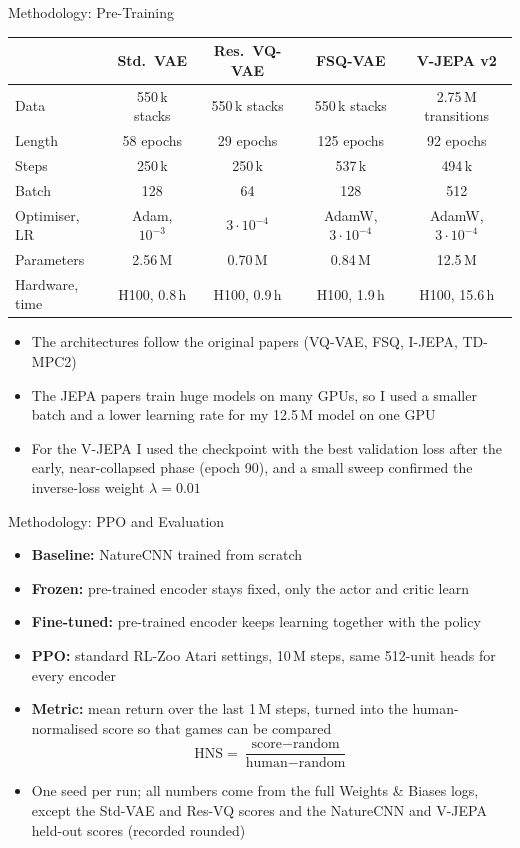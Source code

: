 \documentclass[aspectratio=43,10pt]{beamer}
\begin{document}
\begin{frame}{Methodology: Pre-Training}
  \centering
  {\scriptsize\setlength{\tabcolsep}{3pt}
  \begin{tabular}{@{}lcccc@{}}
    \toprule
    & Std.\ VAE & Res.\ VQ-VAE & FSQ-VAE & V-JEPA v2 \\
    \midrule
    Data & 550\,k stacks & 550\,k stacks & 550\,k stacks & 2.75\,M transitions \\
    Length & 58 epochs & 29 epochs & 125 epochs & 92 epochs \\
    Steps & 250\,k & 250\,k & 537\,k & 494\,k \\
    Batch & 128 & 64 & 128 & 512 \\
    Optimiser, LR & Adam, $10^{-3}$ & $3{\cdot}10^{-4}$ & AdamW, $3{\cdot}10^{-4}$ & AdamW, $3{\cdot}10^{-4}$ \\
    Parameters & 2.56\,M & 0.70\,M & 0.84\,M & 12.5\,M \\
    Hardware, time & H100, 0.8\,h & H100, 0.9\,h & H100, 1.9\,h & H100, 15.6\,h \\
    \bottomrule
  \end{tabular}}
  \vspace{0.8em}
  \begin{itemize}\small\setlength\itemsep{0.4em}
    \item The architectures follow the original papers (VQ-VAE, FSQ, I-JEPA, TD-MPC2)
    \item The JEPA papers train huge models on many GPUs, so I used a smaller batch and a
          lower learning rate for my 12.5\,M model on one GPU
    \item For the V-JEPA I used the checkpoint with the best validation loss after the early,
          near-collapsed phase (epoch 90), and a small sweep confirmed the inverse-loss weight
          $\lambda=0.01$
  \end{itemize}
\end{frame}

\begin{frame}{Methodology: PPO and Evaluation}
  \begin{itemize}\setlength\itemsep{0.55em}
    \item \textbf{Baseline:} NatureCNN trained from scratch
    \item \textbf{Frozen:} pre-trained encoder stays fixed, only the actor and critic learn
    \item \textbf{Fine-tuned:} pre-trained encoder keeps learning together with the policy
    \item \textbf{PPO:} standard RL-Zoo Atari settings, 10\,M steps, same 512-unit heads for
          every encoder
    \item \textbf{Metric:} mean return over the last 1\,M steps, turned into the
          human-normalised score so that games can be compared
      \[\text{HNS}=\frac{\text{score}-\text{random}}{\text{human}-\text{random}}\]
    \item One seed per run; all numbers come from the full Weights \& Biases logs, except the
          Std-VAE and Res-VQ scores and the NatureCNN and V-JEPA held-out scores (recorded
          rounded)
  \end{itemize}
\end{frame}
\end{document}
